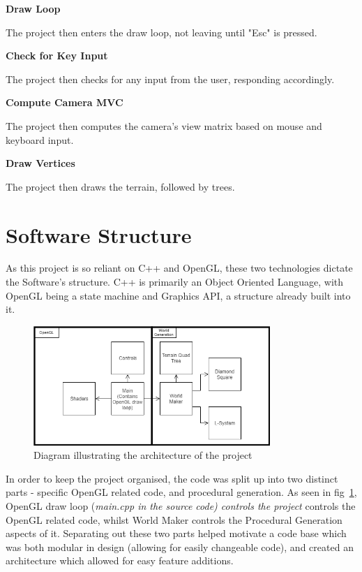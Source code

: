 \documentclass[a4paper,10pt]{report}
\begin{document}
\textbf{Draw Loop} \par
The project then enters the draw loop, not leaving until "Esc" is pressed. \medskip

\textbf{Check for Key Input} \par 
The project then checks for any input from the user, responding accordingly. \medskip

\textbf{Compute Camera MVC} \par 
The project then computes the camera's view matrix based on mouse and keyboard input. \medskip

\textbf{Draw Vertices} \par 
The project then draws the terrain, followed by trees. \medskip

\section{Software Structure}
As this project is so reliant on C++ and OpenGL, these two technologies dictate the Software's structure. C++ is primarily an Object Oriented Language, with OpenGL being a state machine and Graphics API, a structure already built into it. \\

\begin{figure}[h!]
    \centering
\includegraphics[width=0.8\textwidth]{Images/Charts/Architecture.png} 
\caption{Diagram illustrating the architecture of the project}
\label{architecture}
\end{figure} 

In order to keep the project organised, the code was split up into two distinct parts - specific OpenGL related code, and procedural generation. As seen in fig~\ref{architecture}, OpenGL draw loop (\textit{main.cpp in the source code) controls the project} controls the OpenGL related code, whilst World Maker controls the Procedural Generation aspects of it. Separating out these two parts helped motivate a code base which was both modular in design (allowing for easily changeable code), and created an architecture which allowed for easy feature additions. \\
\end{document}
